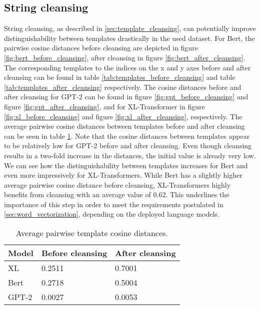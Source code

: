 \subsection{String cleansing}
String cleansing, as described in \ref{sec:template_cleansing}, can potentially  improve distinguishability between templates drastically in the used dataset.
For Bert, the pairwise cosine distances before cleansing are depicted in figure \ref{fig:bert_before_cleansing}, after cleansing in figure \ref{fig:bert_after_cleansing}. The corresponding templates to the indices on the x and y axes before and after cleansing can be found in table \ref{tab:templates_before_cleansing} and table \ref{tab:templates_after_cleansing} respectively.
The cosine distances before and after cleansing for GPT-2 can be found in figure \ref{fig:gpt_before_cleansing} and figure \ref{fig:gpt_after_cleansing}, and for XL-Transformer in figure \ref{fig:xl_before_cleansing} and figure \ref{fig:xl_after_cleansing}, respectively. The average pairwise cosine distances between templates before and after cleansing can be seen in table \ref{tab:average_pairwise_cos_distances}.
Note that the cosine distances between templates appear to be relatively low for GPT-2 before and after cleansing. Even though cleansing results in a two-fold increase in the distances, the initial value is already very low. We can see how the distinguishability between templates increases for Bert and even more impressively for XL-Transformers. While Bert has a slightly higher average pairwise cosine distance before cleansing, XL-Transformers highly benefits from cleansing with an average value of 0.62. This underlines the importance of this step in order to meet the requirements postulated in \ref{sec:word_vectorization}, depending on the deployed language models.



\begin{table}[ht]
\centering
\begin{small}
\begin{tabular}{ p{1.3cm} p{2.5cm} p{2.5cm} }
\toprule
Model & Before cleansing & After cleansing\\
\midrule
XL & 0.2511 & 0.7001\\
Bert & 0.2718 & 0.5004\\
GPT-2 & 0.0027 & 0.0053 \\ 

\bottomrule
\end{tabular}
\caption{Average pairwise template cosine distances.}
\label{tab:average_pairwise_cos_distances}
\end{small}
\end{table}


